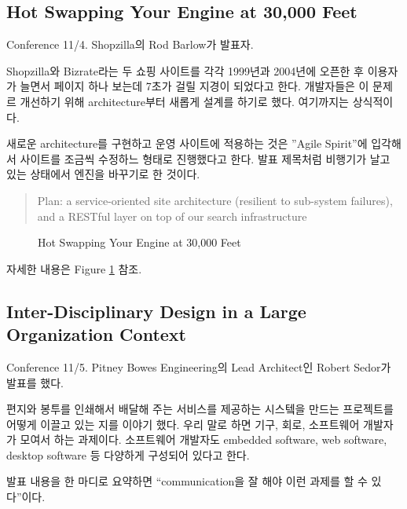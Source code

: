 \documentclass[11pt]{article}
\begin{document}
\subsection{Hot Swapping Your Engine at 30,000 Feet}

Conference 11/4. Shopzilla의 Rod Barlow가 발표자.
 
Shopzilla와 Bizrate라는 두 쇼핑 사이트를 각각 1999년과 2004년에 오픈한
후 이용자가 늘면서 페이지 하나 보는데 7초가 걸릴 지경이 되었다고 한다.
개발자들은 이 문제르 개선하기 위해 architecture부터 새롭게 설계를 하기로 했다.
여기까지는 상식적이다.

새로운 architecture를 구현하고 운영 사이트에 적용하는 것은 ''Agile Spirit''에
입각해서 사이트를 조금씩 수정하느 형태로 진행했다고 한다. 발표 제목처럼
비행기가 날고 있는 상태에서 엔진을 바꾸기로 한 것이다.
 
\begin{quote}
Plan: a service-oriented site architecture (resilient to
sub-system failures), and a RESTful layer on top of our search
infrastructure\cite{barlow}
\end{quote}

\begin{figure}[t]
    \begin{Frame}
        \begin{center}
        \end{center}
    \end{Frame}
    \caption{Hot Swapping Your Engine at 30,000 Feet}
    \label{swapping engine}
\end{figure}

자세한 내용은 Figure \ref{swapping engine} 참조.

\subsection{Inter-Disciplinary Design in a Large
  Organization Context}

Conference 11/5. Pitney Bowes Engineering의 Lead Architect인 
Robert Sedor가 발표를 했다.

편지와 봉투를 인쇄해서 배달해 주는 서비스를 제공하는 시스텤을 만드는
프로젝트를 어떻게 이끌고 있는 지를 이야기 했다.
우리 말로 하면 기구, 회로, 소프트웨어 개발자가 모여서 하는
과제이다. 소프트웨어 개발자도 embedded software, web software, desktop
software 등 다양하게 구성되어 있다고 한다.
 
발표 내용을 한 마디로 요약하면 ``communication을 잘 해야 이런 과제를 할 수 
있다''이다.
 
\end{document}
